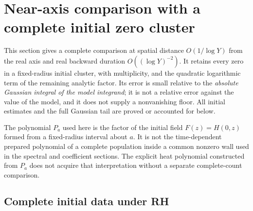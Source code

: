 \section{Near-axis comparison with a complete initial zero cluster}
\label{na-section}
\label{sec:near-axis-cluster}

This section gives a complete comparison at spatial distance
$O(1/\log Y)$ from the real axis and real backward duration
$O((\log Y)^{-2})$. It retains every zero in a fixed-radius initial
cluster, with multiplicity, and the quadratic logarithmic term of the
remaining analytic factor. Its error is small relative to the
\emph{absolute Gaussian integral of the model integrand}; it is not a
relative error against the value of the model, and it does not supply a
nonvanishing floor. All initial estimates and the full Gaussian tail
are proved or accounted for below.

The polynomial $P_a$ used here is the factor of the initial field
$F(z)=H(0,z)$ formed from a fixed-radius interval about $a$. It is not the
time-dependent prepared polynomial of a complete population inside a
common nonzero wall used in the spectral and coefficient sections.
The explicit heat polynomial constructed from $P_a$ does not acquire
that interpretation without a separate complete-count comparison.

\subsection{Complete initial data under RH}
\label{na-initial-data}

